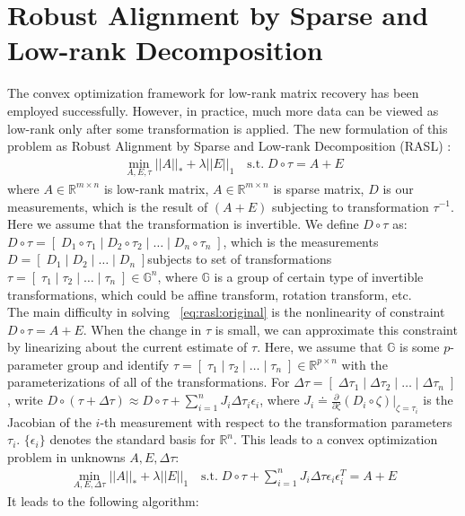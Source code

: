 \documentclass{../../common/projectreport}
\begin{document}
\section{Robust Alignment by Sparse and Low-rank Decomposition}
\label{sec: RASL}

The convex optimization framework for low-rank matrix recovery has been employed successfully. However, in practice, much more data can be viewed as low-rank only after some transformation is applied. The new formulation of this problem as Robust Alignment by Sparse and Low-rank Decomposition (RASL) \cite{Peng:2010}:
\begin{align}
\min_{A, E, \tau}  ||A||_{*} + \lambda||E||_{1} \quad  \text{s.t.} \;  D\circ\tau = A+E
\label{eq:rasl:original}
\end{align}
where $A  \in\mathbb{R}^{m\times n}$ is low-rank matrix, $A\in\mathbb{R}^{m\times n}$ is sparse matrix, $D$ is our measurements, which is the result of $(A+E)$ subjecting to transformation $\tau^{-1}$. Here we assume that the transformation is invertible. 
We define $D\circ\tau$ as: $D\circ\tau = [\;D_{1}\circ\tau_{1} \;|\;D_{2}\circ\tau_{2} \;|\; \dots \;|\; D_{n}\circ\tau_{n}\;]$, which is the measurements $D=[\;D_{1} \;|\;D_{2} \;|\; \dots \;|\; D_{n}\;] $subjects to set of transformations $\tau=[\;\tau_{1} \;|\;\tau_{2} \;|\; \dots \;|\; \tau_{n}\;] \in\mathbb{G}^n$, where $\mathbb{G}$ is a group of certain type of invertible transformations, which could be affine transform, rotation transform, etc.  \\

The main difficulty in solving ~\eqref{eq:rasl:original} is the nonlinearity of constraint $D\circ\tau = A+E$. When the change in $\tau$ is small, we can approximate this constraint by linearizing about the current estimate of $\tau$. Here, we assume that $\mathbb{G}$ is some $p$-parameter group and identify $\tau=[\;\tau_{1} \;|\;\tau_{2} \;|\; \dots \;|\; \tau_{n}\;] \in \mathbb{R}^{p\times n}$ with the parameterizations of all of the transformations. For $\Delta\tau = [\;\Delta\tau_{1} \;|\; \Delta\tau_{2} \;|\; \dots \;|\; \Delta\tau_{n}\;]$, write $D\circ(\tau+\Delta\tau) \approx D\circ\tau + \sum_{i=1}^n J_{i}\Delta\tau_{i}\epsilon_{i}$, where $J_{i} \doteq \frac{\partial}{\partial\zeta}(D_{i}\circ\zeta)|_{\zeta = \tau_{i}}$ is the Jacobian of the $i$-th measurement with respect to the transformation parameters $\tau_{i}$. $\{\epsilon_{i}\}$ denotes the standard basis for $\mathbb{R}^n$. This leads to a convex optimization problem in unknowns $A, E, \Delta\tau$:
\begin{align}
\min_{A, E, \Delta\tau}  ||A||_{*} + \lambda||E||_{1}  \quad \text{s.t.} \;  D\circ\tau + \sum_{i=1}^n J_{i}\Delta\tau\epsilon_{i}\epsilon_{i}^{T}= A+E
\label{eq:rasl:linearized}
\end{align}
It leads to the following algorithm:
\end{document}

